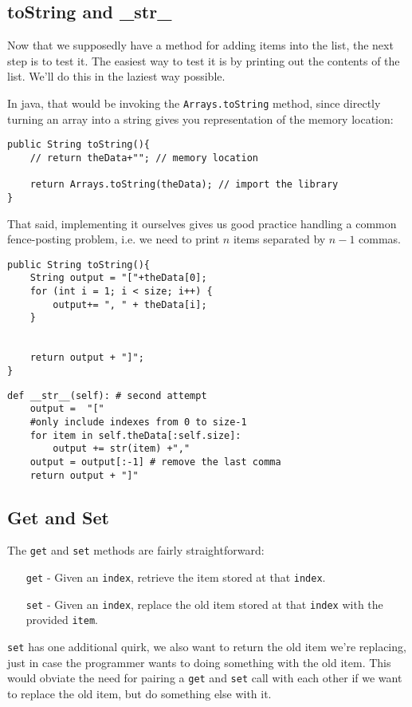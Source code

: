 \subsection{toString and \_str\_}
Now that we supposedly have a method for adding items into the list, the next step is to test it.  
The easiest way to test it is by printing out the contents of the list.  
We'll do this in the laziest way possible.



In java, that would be invoking the \texttt{Arrays.toString} method, since directly turning an array into a string gives you representation of the memory location:
\begin{verbatim}
public String toString(){
	// return theData+""; // memory location
	
	return Arrays.toString(theData); // import the library 
}
\end{verbatim}

That said, implementing it ourselves gives us good practice handling a common fence-posting problem, i.e. we need to print $n$ items separated by $n-1$ commas.
\begin{verbatim}
public String toString(){
	String output = "["+theData[0];
	for (int i = 1; i < size; i++) {
		output+= ", " + theData[i];
	}
	
	
	return output + "]";
}
\end{verbatim}

\begin{verbatim}
def __str__(self): # second attempt
	output =  "["
	#only include indexes from 0 to size-1
	for item in self.theData[:self.size]:
		output += str(item) +","
	output = output[:-1] # remove the last comma
	return output + "]"

\end{verbatim}


\subsection{Get and Set}
The \texttt{get} and \texttt{set} methods are fairly straightforward:
\begin{enumerate}
\item[\texttt{get} -] Given an \texttt{index}, retrieve the item stored at that \texttt{index}.
\item[\texttt{set} -] Given an \texttt{index}, replace the old item stored at that \texttt{index} with the provided \texttt{item}.
\end{enumerate}
\texttt{set} has one additional quirk, we also want to return the old item we're replacing, just in case the programmer wants to doing something with the old item.
This would obviate the need for pairing a \texttt{get} and \texttt{set} call with each other if we want to replace the old item, but do something else with it. 

